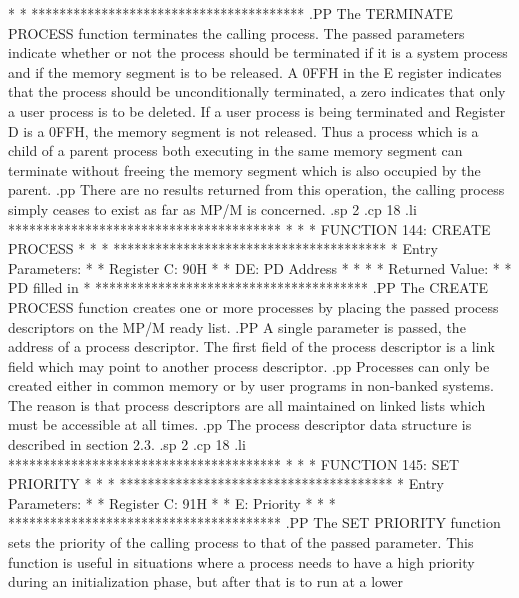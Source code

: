 *                                     *
***************************************
.PP
The TERMINATE PROCESS function terminates
the calling process.  The passed parameters indicate whether
or not the process should be terminated if it is a system process
and if the memory segment is to be released.
A 0FFH in the E register indicates that the process should be unconditionally terminated,
a zero indicates that only a user process is to be deleted.
If  a user process is being terminated and Register D is  a
0FFH, the memory segment is not released.  Thus a process
which is a child of a parent process both executing in  the
same  memory  segment  can terminate  without  freeing  the
memory segment which is also occupied by the parent.
.pp
There are no results
returned from this operation, the calling process simply ceases
to exist as far as MP/M is concerned.
.sp 2
.cp 18
.li
***************************************
*                                     *
*  FUNCTION 144:  CREATE PROCESS      *
*                                     *
***************************************
*  Entry Parameters:                  *
*      Register   C:  90H             *
*                DE:  PD Address      *
*                                     *
*  Returned   Value:                  *
*      PD filled in                   *
***************************************
.PP
The CREATE PROCESS function creates one
or more processes by placing the passed process descriptors
on the MP/M ready list.
.PP
A single parameter is passed, the address of a process
descriptor.  The first field of the process descriptor is a link
field which may point to another process descriptor.
.pp
Processes can only be created either in common memory or by
user  programs in non-banked systems.  The reason is  that
process  descriptors  are all maintained  on  linked  lists
which must be accessible at all times.
.pp
The process descriptor data structure is described in section 2.3.
.sp 2
.cp 18
.li
***************************************
*                                     *
*  FUNCTION 145:  SET PRIORITY        *
*                                     *
***************************************
*  Entry Parameters:                  *
*      Register   C:  91H             *
*                 E:  Priority        *
*                                     *
***************************************
.PP
The SET PRIORITY function sets the priority of
the calling process to that of the passed parameter.  This function
is useful in situations where a process needs to have a high priority
during an initialization phase, but after that is to run at a lower
